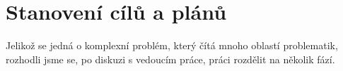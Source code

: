 \section{Stanovení cílů a plánů}

Jelikož se jedná o komplexní problém, který čítá mnoho oblastí problematik, rozhodli jsme se, po diskuzi s vedoucím práce, práci rozdělit na několik fází.


